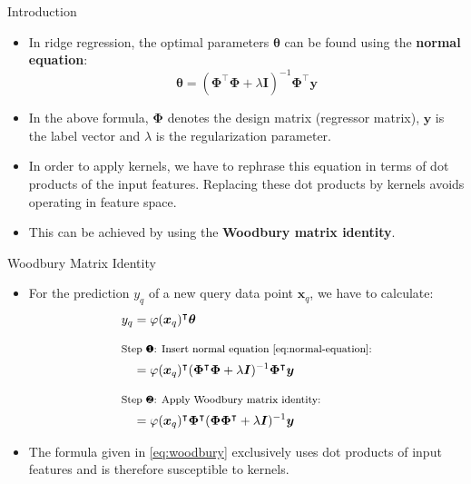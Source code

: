 \begin{dwHeaderFrame}{Introduction}
	\begin{itemize}
		\item In ridge regression, the optimal parameters $\bm{\theta}$ can be found using the \textbf{normal equation}:
		\begin{equation}
			\bm{\theta} = (\bm{\Phi}^{\intercal} \bm{\Phi} + \lambda \bm{I})^{-1} \bm{\Phi}^{\intercal} \bm{y}
			\label{eq:normal-equation}
		\end{equation}
		\item In the above formula, $\bm{\Phi}$ denotes the design matrix (regressor matrix), $\bm{y}$ is the label vector and $\lambda$ is the regularization parameter.
		\item In order to apply kernels, we have to rephrase this equation in terms of dot products of the input features. Replacing these dot products by kernels avoids operating in feature space.
		\item This can be achieved by using the \textbf{Woodbury matrix identity}.
	\end{itemize}
\end{dwHeaderFrame}


\begin{dwHeaderFrame}{Woodbury Matrix Identity}
	\begin{itemize}
		\item For the prediction $y_q$ of a new query data point $\bm{x}_q$, we have to calculate:
		\begin{align}
			y_q
				&= \varphi(\bm{x}_q)^{\intercal} \bm{\theta} \\[2mm]
			\shortintertext{\footnotesize Step \ding{182}: Insert normal equation \cref{eq:normal-equation}:}
				&= \varphi(\bm{x}_q)^{\intercal} (\bm{\Phi}^{\intercal} \bm{\Phi} + \lambda \bm{I})^{-1} \bm{\Phi}^{\intercal} \bm{y} \\[2mm]
			\shortintertext{\footnotesize Step \ding{183}: Apply Woodbury matrix identity:}
				&= \varphi(\bm{x}_q)^{\intercal} \bm{\Phi}^{\intercal}(\bm{\Phi} \bm{\Phi}^{\intercal} + \lambda \bm{I})^{-1} \bm{y}
			\label{eq:woodbury}
		\end{align}
		\item The formula given in \cref{eq:woodbury} exclusively uses dot products of input features and is therefore susceptible to kernels.
	\end{itemize}
\end{dwHeaderFrame}


